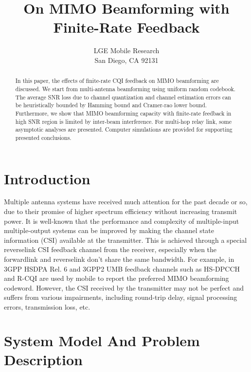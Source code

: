 \documentclass[a4paper,10pt,fleqn, twocolumn]{IEEEtran}
\title{On MIMO Beamforming with Finite-Rate Feedback}
\author{LGE Mobile Research\\San Diego, CA 92131}
\date{}
\begin{document}
\maketitle
\begin{abstract}\small
In this paper, the effects of finite-rate CQI feedback on MIMO
beamforming are discussed. We start from multi-antenna beamforming
using uniform random codebook. The average SNR loss due to channel
quantization and channel estimation errors can be heuristically
bounded by Hamming bound and Cramer-rao lower bound. Furthermore,
we show that MIMO beamforming capacity with finite-rate feedback
in high SNR region is limited by inter-beam interference. For
multi-hop relay link, some asymptotic analyses are presented.
Computer simulations are provided for supporting presented
conclusions.
\end{abstract}

\section{Introduction}
Multiple antenna systems have received much attention for the past
decade or so, due to their promise of higher spectrum efficiency
without increasing transmit power. It is well-known that the
performance and complexity of multiple-input multiple-output
systems can be improved by making the channel state information
(CSI) available at the transmitter. This is achieved through a
special reverselink CSI feedback channel from the receiver,
especially when the forwardlink and reverselink don't share the
same bandwidth. For example, in 3GPP HSDPA Rel. 6 and 3GPP2 UMB
feedback channels such as HS-DPCCH and R-CQI are used by mobile to
report the preferred MIMO beamforming codeword. However, the CSI
received by the transmitter may not be perfect and suffers from
various impairments, including round-trip delay, signal processing
errors, transmission loss, etc. 


\section{System Model And Problem Description}
\end{document}
